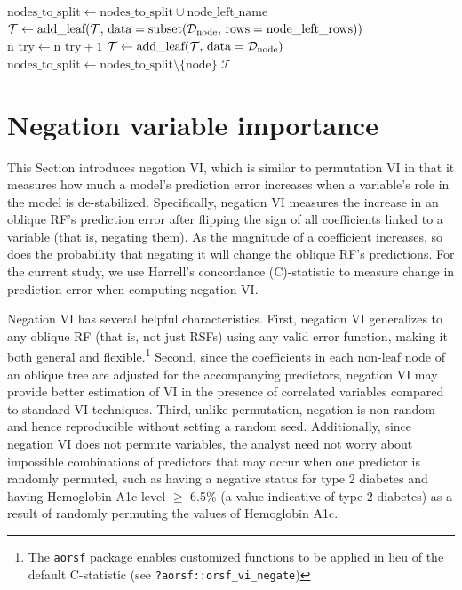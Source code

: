 \documentclass[twoside,11pt]{article}\usepackage[]{graphicx}\usepackage[]{xcolor}
\newcommand{\dataset}{{\cal D}}
\newcommand{\ie}{that is}
\begin{document}
\begin{algorithm}
\begin{algorithmic}[1]
           \State $\text{nodes\_to\_split} \gets \text{nodes\_to\_split} \cup \text{node\_left\_name}$
         \Else
           \State $\mathcal{T} \gets \text{add\_leaf}(\mathcal{T},\, \text{data} = \text{subset}(\dataset_{\text{node}},\,\text{rows} = \text{node\_left\_rows}))$
         \EndIf
         \State $\text{n\_try} \gets \text{n\_try} + 1$
         \State {}
       \Else
         \State $\mathcal{T} \gets \text{add\_leaf}(\mathcal{T},\, \text{data} =\dataset_{\text{node}})$
       \EndIf
       \State $\text{nodes\_to\_split} \gets \text{nodes\_to\_split} \setminus \{\text{node}\}$
     \EndFor
  \EndWhile
  \State \Return $\mathcal{T}$
  \end{algorithmic}
\end{algorithm}

\section{Negation variable importance} \label{sec:negation_vi}

This Section introduces negation VI, which is similar to permutation VI in that it measures how much a model’s prediction error increases when a variable’s role in the model is de-stabilized. Specifically, negation VI measures the increase in an oblique RF's prediction error after flipping the sign of all coefficients linked to a variable (\ie, negating them). As the magnitude of a coefficient increases, so does the probability that negating it will change the oblique RF's predictions. For the current study, we use Harrell's concordance (C)-statistic \citep{harrell1982evaluating} to measure change in prediction error when computing negation VI.

Negation VI has several helpful characteristics. First, negation VI generalizes to any oblique RF (\ie, not just RSFs) using any valid error function, making it both general and flexible.\footnote{The \texttt{aorsf} package enables customized functions to be applied in lieu of the default C-statistic (see \texttt{?aorsf::orsf\_vi\_negate})} Second, since the coefficients in each non-leaf node of an oblique tree are adjusted for the accompanying predictors, negation VI may provide better estimation of VI in the presence of correlated variables compared to standard VI techniques. Third, unlike permutation, negation is non-random and hence reproducible without setting a random seed. Additionally, since negation VI does not permute variables, the analyst need not worry about impossible combinations of predictors that may occur when one predictor is randomly permuted, such as having a negative status for type 2 diabetes and having Hemoglobin A1c level $\geq$ 6.5\% (a value indicative of type 2 diabetes) as a result of randomly permuting the values of Hemoglobin A1c.
\end{document}
